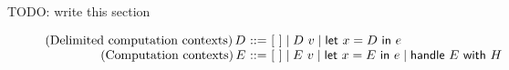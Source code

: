 \documentclass[preprint]{sigplanconf}
\makeatletter
\newcommand{\many}{\overline}
\newcommand\ba{\begin{array}}
\newcommand\ea{\end{array}}
\newenvironment{equations}{\[\ba{@{}r@{~}c@{~}l@{}}}{\ea\]}
\newcommand{\key}[1]{\mathsf{#1}}
\newcommand{\handleSymbol}{\mathbin{?}}
\newcommand{\handle}[2]{{#1} \handleSymbol {#2}}
\newcommand{\force}[1]{{#1}!}
\makeatother
\begin{document}
TODO: write this section

\begin{figure*}

\begin{equations}
(\textrm{Delimited computation contexts})\, D
  &::=& [~] \mid D~v \mid \key{let}~x=D~\key{in}~e \\
(\textrm{Computation contexts})\, E
  &::=& [~] \mid E~v \mid \key{let}~x=E~\key{in}~e
            \mid \key{handle}~E~\key{with}~H \\
\end{equations}%


\end{figure*}
\end{document}
